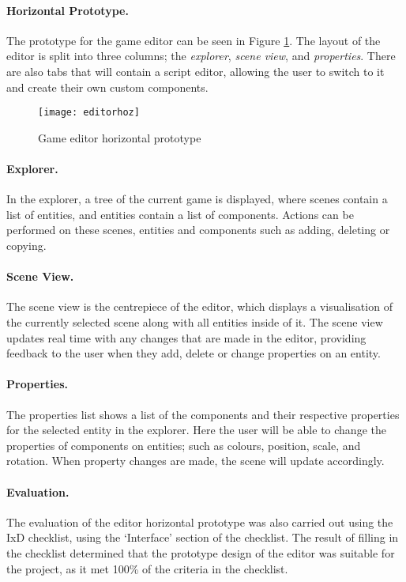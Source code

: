 
	\paragraph{Horizontal Prototype.}
	The prototype for the game editor can be seen in Figure \ref{fig:gameeditorprototype}. The layout of the editor is split into three columns; the \emph{explorer}, \emph{scene view}, and \emph{properties}. There are also tabs that will contain a script editor, allowing the user to switch to it and create their own custom components.

	\begin{figure}[h]
		\centering
		\texttt{[image: editorhoz]}
		\caption{Game editor horizontal prototype}
		\label{fig:gameeditorprototype}
	\end{figure}

	\paragraph{Explorer.}
	In the explorer, a tree of the current game is displayed, where scenes contain a list of entities, and entities contain a list of components. Actions can be performed on these scenes, entities and components such as adding, deleting or copying.

	\paragraph{Scene View.}
	The scene view is the centrepiece of the editor, which displays a visualisation of the currently selected scene along with all entities inside of it. The scene view updates real time with any changes that are made in the editor, providing feedback to the user when they add, delete or change properties on an entity.

	\paragraph{Properties.}
	The properties list shows a list of the components and their respective properties for the selected entity in the explorer. Here the user will be able to change the properties of components on entities; such as colours, position, scale, and rotation. When property changes are made, the scene will update accordingly.

	\paragraph{Evaluation.}
	The evaluation of the editor horizontal prototype was also carried out using the IxD checklist, using the `Interface' section of the checklist. The result of filling in the checklist determined that the prototype design of the editor was suitable for the project, as it met 100\% of the criteria in the checklist.

